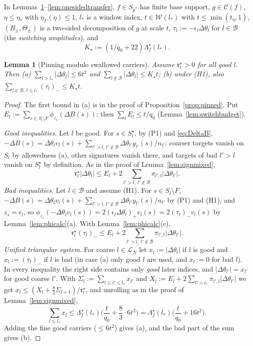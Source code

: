 \documentclass[10pt]{amsart}
\newtheorem{lemma}[theorem]{Lemma}
\theoremstyle{definition}
\theoremstyle{remark}
\newcommand{\Cset}{\mathcal C}
\begin{document}
In Lemmas~\ref{lem:modswallow}--\ref{lem:onesidedtransfer}, $f\in S_{p^*}$
has finite base support, $g\in\Cset(f)$, $\eta\le\eta_*$ with
$\eta_\Gamma(\eta)\le1$, $l_*$ is a window index, $t\in\mathcal W(l_*)$ with
$t\le\min(t_\eta,1)$, $(B_\pm,\Theta_\pm)$ is a two-sided decomposition of
$g$ at scale $t$, $\tau_l:=-\epsilon_l\Delta\theta_l$ for $l\in\mathcal B$
(the \emph{switching amplitudes}), and
\[
 K_\star:=(1/q_0+22)\Lambda^\star_f(l_*).
\]

\begin{lemma}[Pinning modulo swallowed carriers]\label{lem:modswallow}
Assume $\mathfrak r^\star_l>0$ for all good $l$.  Then
\textup{(a)} $\sum_{l>l_*}|\Delta\theta_l|\le6t^2$ and
$\sum_{l\notin\mathcal B}|\Delta\theta_l|\le K_\star t$;
\textup{(b)} under \textup{(H1)}, also
$\sum_{l\in\mathcal B,\,l\le l_*}(\tau_l)_-\le K_\star t$.
\end{lemma}

\begin{proof}
The first bound in (a) is in the proof of Proposition~\ref{prop:pinned}.
Put $E_l:=\sum_{s\in S_l\setminus F}\phi_{z_s}(\Delta B(s))$; then
$\sum_lE_l\le t/q_0$ (Lemma~\ref{lem:switchbudget}).

\emph{Good inequalities.}  Let $l$ be good.  For $s\in S^\star_l$, by (P1)
and \eqref{eq:DeltaB}, $-\Delta B(s)=\Delta\theta_lv_l(s)+\sum_{l'>l,\,l'
\notin\mathcal B}\Delta\theta_{l'}y_{l'}(s)/n_{l'}$: coarser targets vanish
on $S_l$ by allowedness (a), other signatures vanish there, and targets of
bad $l'>l$ vanish on $S^\star_l$ by definition.  As in the proof of
Lemma~\ref{lem:signmixed},
\[
 \mathfrak r^\star_l|\Delta\theta_l|\le E_l+2\sum_{l'>l,\ l'\notin\mathcal B}
 \pi_{l',l}|\Delta\theta_{l'}| .
\]
\emph{Bad inequalities.}  Let $l\in\mathcal B$ and assume (H1).  For $s\in
S_l\setminus F$, $-\Delta B(s)=\Delta\theta_lv_l(s)+\sum_{l'>l,\,l'\notin
\mathcal B}\Delta\theta_{l'}y_{l'}(s)/n_{l'}$ by (P1) and (H1), and
$z_s=\epsilon_l$, so $\phi_{z_s}(-\Delta\theta_lv_l(s))=2(\epsilon_l
\Delta\theta_l)_+v_l(s)=2(\tau_l)_-v_l(s)$ by Lemma~\ref{lem:phicalc}(a).
With Lemma~\ref{lem:phicalc}(c),
\[
 \mathfrak r^\star_l(\tau_l)_-\le E_l+2\sum_{l'>l,\ l'\notin\mathcal B}
 \pi_{l',l}|\Delta\theta_{l'}| .
\]
\emph{Unified triangular system.}  For coarse $l\in\mathcal L_N$ let
$x_l:=|\Delta\theta_l|$ if $l$ is good and $x_l:=(\tau_l)_-$ if $l$ is bad
(in case (a) only good $l$ are used, and $x_l:=0$ for bad $l$).  In every
inequality the right side contains only \emph{good} later indices, and
$|\Delta\theta_{l'}|=x_{l'}$ for good coarse $l'$.  With
$\Sigma_l:=\sum_{l\le l'\le l_*}x_{l'}$ and $X_l:=E_l+2\sum_{l'>l_*}
\pi_{l',l}|\Delta\theta_{l'}|$ we get $x_l\le(X_l+\frac83\Sigma_{l+1})/
\mathfrak r^\star_l$, and unrolling as in the proof of
Lemma~\ref{lem:signmixed},
\[
 \sum_{l\le l_*}x_l\le\Lambda^\star_f(l_*)\Big(\frac t{q_0}+\frac83\cdot
 6t^2\Big)=\Lambda^\star_f(l_*)\Big(\frac t{q_0}+16t^2\Big).
\]
Adding the fine good carriers ($\le6t^2$) gives (a), and the bad part of
the sum gives (b).
\end{proof}
\end{document}
